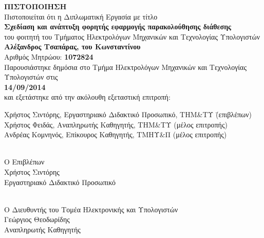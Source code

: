 \thispagestyle{empty}

\begin{center}

    \textbf{\LARGE ΠΙΣΤΟΠΟΙΗΣΗ}\\[2em]
    
    Πιστοποιείται ότι η Διπλωματική Εργασία με τίτλο \\[1em]
    
    \textbf{\Large Σχεδίαση και ανάπτυξη φορητής εφαρμογής παρακολούθησης διάθεσης} \\[2em]
    
    του φοιτητή του Τμήματος Ηλεκτρολόγων Μηχανικών και Τεχνολογίας Υπολογιστών \\[2em]
    
    \textbf{\large Αλέξανδρος Τσαπάρας, του Κωνσταντίνου} \\[1em]
    
    Αριθμός Μητρώου: \textbf{1072824} \\[2em]
    
    Παρουσιάστηκε δημόσια στο Τμήμα Ηλεκτρολόγων Μηχανικών και Τεχνολογίας Υπολογιστών στις \\[2em]
    
    \textbf{14/09/2014} \\[2em]
    
    και εξετάστηκε από την ακόλουθη εξεταστική επιτροπή: \\[3em]
    
    \begin{tabbing}
        Χρήστος Σιντόρης, Εργαστηριακό Διδακτικό Προσωπικό, ΤΗΜ\&ΤΥ \hspace{1cm} \= (επιβλέπων) \\
        Χρήστος Φειδάς, Αναπληρωτής Καθηγητής, ΤΗΜ\&ΤΥ \> (μέλος επιτροπής) \\
        Ανδρέας Κομνηνός, Επίκουρος Καθηγητής, ΤΜΗΥ\&Π \> (μέλος επιτροπής)
    \end{tabbing}
    
    \vfill
    
    \begin{minipage}[t]{0.45\textwidth}
        \begin{center}
            \underline{\hspace{5cm}} \\[0.2em]
            Ο Επιβλέπων \\[3.5em]
            Χρήστος Σιντόρης \\[0.5em]
            Εργαστηριακό Διδακτικό Προσωπικό
        \end{center}
    \end{minipage}%
    \hfill
    \begin{minipage}[t]{0.45\textwidth}
        \begin{center}
            \underline{\hspace{5cm}} \\[0.2em]
            Ο Διευθυντής του Τομέα Ηλεκτρονικής και Υπολογιστών \\[1.6em] 
            Γεώργιος Θεοδωρίδης \\[0.5em]
            Αναπληρωτής Καθηγητής
        \end{center}
    \end{minipage}  
    
\end{center}

\thispagestyle{empty}